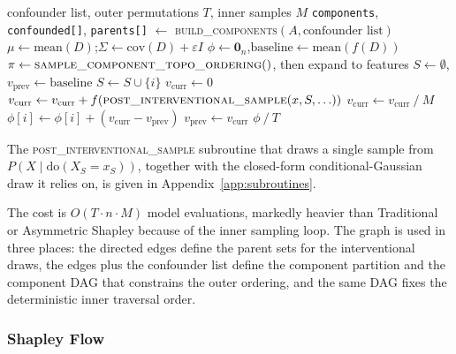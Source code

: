 \documentclass[12pt,a4paper,oneside]{article}
\begin{document}
\begin{algorithm}[H]
  \caption{Causal Shapley (post-interventional)}
  \label{alg:causal}
  \begin{algorithmic}[1]
    \Statex \hspace{2.5em} confounder list, outer permutations $T$, inner samples $M$
    \PRECOMPUTE \texttt{components}, \texttt{confounded[]}, \texttt{parents[]} $\gets$ \textsc{build\_components}$(A, \text{confounder list})$
    \State $\mu \gets \text{mean}(D)$;\quad $\Sigma \gets \text{cov}(D) + \varepsilon I$  
    \State $\phi \gets \mathbf{0}_n$,\quad $\text{baseline} \gets \text{mean}(f(D))$
      
      \State $\pi \gets \textsc{sample\_component\_topo\_ordering}()$, then expand to features
      \State $S \gets \emptyset$,\quad $v_{\text{prev}} \gets \text{baseline}$
        \State $S \gets S \cup \{i\}$
        \State $v_{\text{curr}} \gets 0$  
          \State $v_{\text{curr}} \gets v_{\text{curr}} + f(\textsc{post\_interventional\_sample}(x, S, \ldots))$
        \EndFor
        \State $v_{\text{curr}} \gets v_{\text{curr}} \mathbin{/} M$
        \State $\phi[i] \gets \phi[i] + (v_{\text{curr}} - v_{\text{prev}})$
        \State $v_{\text{prev}} \gets v_{\text{curr}}$
      \EndFor
    \EndFor
    \Return $\phi \mathbin{/} T$
  \end{algorithmic}
\end{algorithm}

The \textsc{post\_interventional\_sample} subroutine that draws a single sample from $P(X \mid \mathrm{do}(X_S = x_S))$, together with the closed-form conditional-Gaussian draw it relies on, is given in Appendix~\ref{app:subroutines}.

The cost is $O(T \cdot n \cdot M)$ model evaluations, markedly heavier than Traditional or Asymmetric Shapley because of the inner sampling loop. The graph is used in three places: the directed edges define the parent sets for the interventional draws, the edges plus the confounder list define the component partition and the component DAG that constrains the outer ordering, and the same DAG fixes the deterministic inner traversal order.

\subsubsection{Shapley Flow}
\label{sec:flow_alg}
\end{document}
